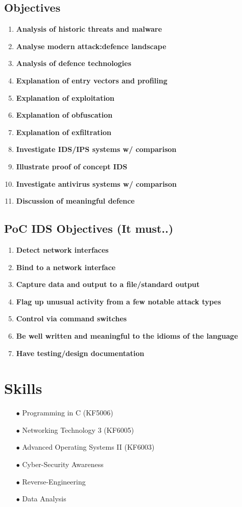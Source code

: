 \subsection{Objectives}
\begin{enumerate}
	\item \textbf{Analysis of historic threats and malware}
	\item \textbf{Analyse modern attack:defence landscape}
	\item \textbf{Analysis of defence technologies}
	\item \textbf{Explanation of entry vectors and profiling}
	\item \textbf{Explanation of exploitation}
	\item \textbf{Explanation of obfuscation}
	\item \textbf{Explanation of exfiltration}
	\item \textbf{Investigate IDS/IPS systems w/ comparison}
	\item \textbf{Illustrate proof of concept IDS}
	\item \textbf{Investigate antivirus systems w/ comparison}
	\item \textbf{Discussion of meaningful defence}
\end{enumerate}

\subsection{PoC IDS Objectives (It must..)}
\begin{enumerate}
	\item \textbf{Detect network interfaces}
	\item \textbf{Bind to a network interface}
	\item \textbf{Capture data and output to a file/standard output}
	\item \textbf{Flag up unusual activity from a few notable attack types}
	\item \textbf{Control via command switches}
	\item \textbf{Be well written and meaningful to the idioms of the language}
	\item \textbf{Have testing/design documentation}
	
\end{enumerate}

\section{Skills}
\begin{enumerate}
	\item [$\bullet$] Programming in C (KF5006)
	\item [$\bullet$] Networking Technology 3 (KF6005)
	\item [$\bullet$] Advanced Operating Systems II (KF6003)
	\item [$\bullet$] Cyber-Security Awareness
	\item [$\bullet$] Reverse-Engineering
	\item [$\bullet$] Data Analysis
\end{enumerate}

